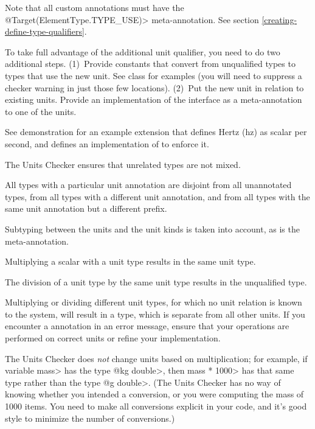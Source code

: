 Note that all custom annotations must have the
\<@Target(ElementType.TYPE\_USE)> meta-annotation. See section
\ref{creating-define-type-qualifiers}.

To take full advantage of the additional unit qualifier, you need to
do two additional steps.
(1)~Provide constants that convert from unqualified types to types that use
the new unit.
See class  for examples (you will need to suppress a
checker warning in just those few locations).
(2)~Put the new unit in relation to existing units.
Provide an
implementation of the  interface as a
meta-annotation to one of the units.

See demonstration  for an example
extension that defines Hertz (hz) as scalar per second, and defines an
implementation of  to enforce it.




The Units Checker ensures that unrelated types are not mixed.

All types with a particular unit annotation are
disjoint from all unannotated types, from all types with a different unit
annotation, and from all types with the same unit annotation but a
different prefix.

Subtyping between the units and the unit kinds is taken into account,
as is the  meta-annotation.

Multiplying a scalar with a unit type results in the same unit type.

The division of a unit type by the same unit type
results in the unqualified type.

Multiplying or dividing different unit types, for which no unit
relation is known to the system, will result in a 
type, which is separate from all other units.
If you encounter a  annotation in an error message,
ensure that your operations are performed on correct units or refine
your  implementation.

The Units Checker does \emph{not} change units based on multiplication; for
example, if variable \<mass> has the type \<@kg double>, then \<mass *
1000> has that same type rather than the type \<@g double>.  (The Units
Checker has no way of knowing whether you intended a conversion, or you
were computing the mass of 1000 items.  You need to make all conversions
explicit in your code, and it's good style to minimize the number of
conversions.)


